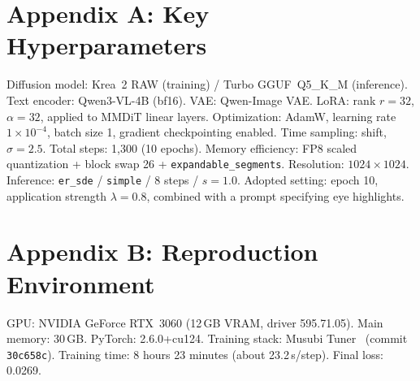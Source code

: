 \documentclass[10pt,twocolumn]{article}
\begin{document}
\section*{Appendix A: Key Hyperparameters}
Diffusion model: Krea~2 RAW (training) / Turbo GGUF~Q5\_K\_M (inference). Text encoder: Qwen3-VL-4B (bf16). VAE: Qwen-Image VAE. LoRA: rank $r=32$, $\alpha=32$, applied to MMDiT linear layers. Optimization: AdamW, learning rate $1\times10^{-4}$, batch size 1, gradient checkpointing enabled. Time sampling: shift, $\sigma=2.5$. Total steps: 1{,}300 (10 epochs). Memory efficiency: FP8 scaled quantization + block swap 26 + \texttt{expandable\_segments}. Resolution: $1024\times1024$. Inference: \texttt{er\_sde} / \texttt{simple} / 8 steps / $s=1.0$. Adopted setting: epoch 10, application strength $\lambda=0.8$, combined with a prompt specifying eye highlights.

\section*{Appendix B: Reproduction Environment}
GPU: NVIDIA GeForce RTX~3060 (12\,GB VRAM, driver 595.71.05). Main memory: 30\,GB. PyTorch: 2.6.0+cu124. Training stack: Musubi Tuner~\cite{musubi2026} (commit \texttt{30c658c}). Training time: 8 hours 23 minutes (about 23.2\,s/step). Final loss: 0.0269.
\end{document}
